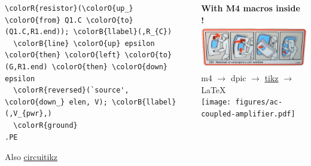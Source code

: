 \begin{frame}[fragile]
\begin{columns}
\begin{column}{.5\textwidth}
\begin{Verbatim}[commandchars=\\\{\}]
  \colorR{resistor}(\colorO{up_} \colorO{from} Q1.C \colorO{to} (Q1.C,R1.end)); \colorB{llabel}(,R_{C})
  \colorB{line} \colorO{up} epsilon \colorO{then} \colorO{left} \colorO{to} (G,R1.end) \colorO{then} \colorO{down} epsilon
  \colorR{reversed}(`source', \colorO{down_} elen, V); \colorB{llabel}(,V_{pwr},)
  \colorR{ground}
.PE
\end{Verbatim}
      \normalsize
      {\tiny Also \href{http://www.texample.net/tikz/examples/tag/circuitikz}{circuitikz}}
    \end{column}
    \begin{column}{.5\textwidth}
      \begin{center}
        \textbf{With M4 macros inside !} \\
        \includegraphics[width=.6\textwidth]{images/emergency-exit-1.jpg} \\ %
        m4 $\rightarrow$ dpic $\rightarrow$ \href{http://www.texample.net/tikz}{tikz} $\rightarrow$ \LaTeX \\
        \texttt{[image: figures/ac-coupled-amplifier.pdf]}
      \end{center}
    \end{column}
  \end{columns}
\end{frame}

